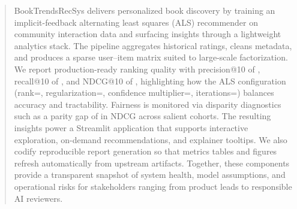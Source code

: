 \begin{abstract}
BookTrendsRecSys delivers personalized book discovery by training an implicit-feedback alternating least squares (ALS) recommender on community interaction data and surfacing insights through a lightweight analytics stack. The pipeline aggregates historical ratings, cleans metadata, and produces a sparse user--item matrix suited to large-scale factorization. We report production-ready ranking quality with precision@10 of \pTen, recall@10 of \rTen, and NDCG@10 of \ndcgTen, highlighting how the ALS configuration (rank=\rankParam, regularization=\regParam, confidence multiplier=\alphaParam, iterations=\itersParam) balances accuracy and tractability. Fairness is monitored via disparity diagnostics such as a parity gap of \parityGap{} in NDCG across salient cohorts. The resulting insights power a Streamlit application that supports interactive exploration, on-demand recommendations, and explainer tooltips. We also codify reproducible report generation so that metrics tables and figures refresh automatically from upstream artifacts. Together, these components provide a transparent snapshot of system health, model assumptions, and operational risks for stakeholders ranging from product leads to responsible AI reviewers.
\end{abstract}
